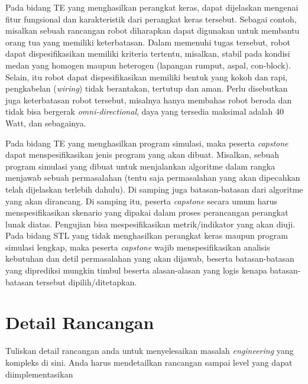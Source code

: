     Pada bidang TE yang menghasilkan perangkat keras, dapat dijelaskan mengenai fitur fungsional dan karakteristik dari perangkat keras tersebut. Sebagai contoh, misalkan sebuah rancangan robot diharapkan dapat digunakan untuk membantu orang tua yang memiliki keterbatasan. Dalam memenuhi tugas tersebut, robot dapat dispesifikasikan memiliki kriteria tertentu, misalkan, stabil pada kondisi medan yang homogen maupun heterogen (lapangan rumput, aspal, con-block). Selain, itu robot dapat dispesifikasikan memiliki bentuk yang kokoh dan rapi, pengkabelan (\textit{wiring}) tidak berantakan, tertutup dan aman. Perlu disebutkan juga keterbatasan robot tersebut, misalnya hanya membahas robot beroda dan tidak bisa bergerak \textit{omni-directional}, daya yang tersedia maksimal adalah 40 Watt, dan sebagainya. 

    Pada bidang TE yang menghasilkan program simulasi, maka peserta \textit{capstone} dapat menspesifikasikan jenis program yang akan dibuat. Misalkan, sebuah program simulasi yang dibuat untuk menjalankan algoritme dalam rangka menjawab sebuah permasalahan (tentu saja permasalahan yang akan dipecahkan telah dijelaskan terlebih dahulu). Di samping juga batasan-batasan dari algoritme yang akan dirancang. Di samping itu, peserta \textit{capstone} secara umum harus menspesifikasikan skenario yang dipakai dalam proses perancangan perangkat lunak diatas. Pengujian bisa mespesifikasikan metrik/indikator yang akan diuji. Pada bidang STL yang tidak menghasilkan perangkat keras maupun program simulasi lengkap, maka peserta \textit{capstone} wajib menspesifikasikan analisis kebutuhan dan detil permasalahan yang akan dijawab, beserta batasan-batasan yang diprediksi mungkin timbul beserta alasan-alasan yang logis kenapa batasan-batasan tersebut dipilih/ditetapkan.

    
\section{Detail Rancangan}
\label{sec:Detail_Rancangan}
    
Tuliskan detail rancangan anda untuk menyelesaikan masalah \textit{engineering} yang kompleks di sini. Anda harus mendetailkan rancangan sampai level yang dapat diimplementasikan
